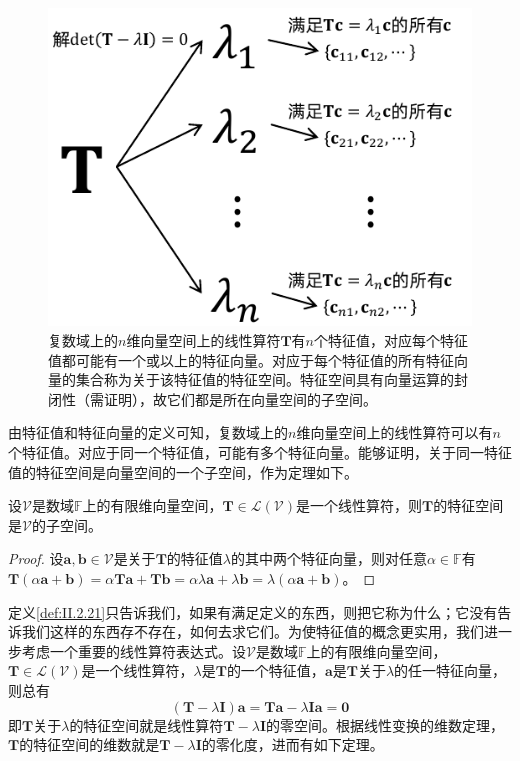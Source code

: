\documentclass[main.tex]{subfiles}
\begin{document}
\begin{figure}[htbp]
    \centering
    \includegraphics{images/characteristic_values.pdf}
    \caption{复数域上的$n$维向量空间上的线性算符$\mathbf{T}$有$n$个特征值，对应每个特征值都可能有一个或以上的特征向量。对应于每个特征值的所有特征向量的集合称为关于该特征值的特征空间。特征空间具有向量运算的封闭性（需证明），故它们都是所在向量空间的子空间。}
    \label{fig:II.2.3}
\end{figure}

由特征值和特征向量的定义可知，复数域上的$n$维向量空间上的线性算符可以有$n$个特征值。对应于同一个特征值，可能有多个特征向量。能够证明，关于同一特征值的特征空间是向量空间的一个子空间，作为定理如下。

\begin{theorem}\label{thm:II.2.26}
    设$\mathcal{V}$是数域$\mathbb{F}$上的有限维向量空间，$\mathbf{T}\in\mathcal{L}\left(\mathcal{V}\right)$是一个线性算符，则$\mathbf{T}$的特征空间是$\mathcal{V}$的子空间。
\end{theorem}
\begin{proof}
    设$\mathbf{a},\mathbf{b}\in\mathcal{V}$是关于$\mathbf{T}$的特征值$\lambda$的其中两个特征向量，则对任意$\alpha\in\mathbb{F}$有$\mathbf{T}\left(\alpha\mathbf{a}+\mathbf{b}\right)=\alpha\mathbf{Ta}+\mathbf{Tb}=\alpha\lambda\mathbf{a}+\lambda\mathbf{b}=\lambda\left(\alpha\mathbf{a}+\mathbf{b}\right)$。
\end{proof}

定义\ref{def:II.2.21}只告诉我们，如果有满足定义的东西，则把它称为什么；它没有告诉我们这样的东西存不存在，如何去求它们。为使特征值的概念更实用，我们进一步考虑一个重要的线性算符表达式。设$\mathcal{V}$是数域$\mathbb{F}$上的有限维向量空间，$\mathbf{T}\in\mathcal{L}\left(\mathcal{V}\right)$是一个线性算符，$\lambda$是$\mathbf{T}$的一个特征值，$\mathbf{a}$是$\mathbf{T}$关于$\lambda$的任一特征向量，则总有
\[\left(\mathbf{T}-\lambda\mathbf{I}\right)\mathbf{a}=\mathbf{Ta}-\lambda\mathbf{Ia}=\mathbf{0}\]
即$\mathbf{T}$关于$\lambda$的特征空间就是线性算符$\mathbf{T}-\lambda\mathbf{I}$的零空间。根据线性变换的维数定理，$\mathbf{T}$的特征空间的维数就是$\mathbf{T}-\lambda\mathbf{I}$的零化度，进而有如下定理。
\end{document}
